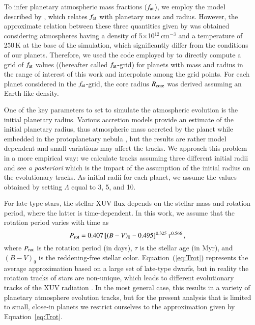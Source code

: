 \documentclass{aa}
\begin{document}
{To infer planetary atmospheric mass fractions ($f_{\rm at}$), we
employ the model described by \citet{johnstone2015}, which relates
$f_{\rm at}$ with planetary mass and radius. However, the
approximate relation between these three quantities given by
\citet{johnstone2015} was obtained considering atmospheres having
a density of 5$\times$10$^{12}$\,cm$^{-3}$ and a temperature of
250\,K at the base of the simulation, which significantly differ
from the conditions of our planets. Therefore, we used the code
employed by \citet{johnstone2015} to directly compute a grid of
$f_{\rm at}$ values ((hereafter called $f_{\rm at}$-grid) for
planets with mass and radius in the range of interest of this work
and interpolate among the grid points. For each planet considered
in the $f_{\rm at}$-grid, the core radius $R_{\rm core}$ was
derived assuming an Earth-like density.}

{One of the key parameters to set to simulate the atmospheric
evolution is the initial planetary radius. Various accretion
models provide an estimate of the initial planetary radius, thus
atmospheric mass accreted by the planet while embedded in the
protoplanetary nebula \citep[e.g.,][]{stokl2016}, but the results
are rather model dependent and small variations may affect the
tracks. We approach this problem in a more empirical way: we
calculate tracks assuming three different initial radii and see
{\it a posteriori} which is the impact of the assumption of the
initial radius on the evolutionary tracks. As initial radii for
each planet, we assume the values obtained by setting $\Lambda$
equal to 3, 5, and 10.}

{For late-type stars, the stellar XUV flux depends on the stellar
mass and rotation period, where the latter is time-dependent. In
this work, we assume that the rotation period varies with time as
\citep{mamajek2008}}
\begin{equation}
\label{eq:Trot}
P_{\rm rot}=0.407\,[(B-V)_0-0.495]^{0.325}\,\tau^{0.566}\,,
\end{equation}
where $P_{\rm rot}$ is the rotation period (in days), $\tau$ is
the stellar age (in Myr), and $(B-V)_0$ is the reddening-free
stellar color. {Equation~(\ref{eq:Trot}) represents the average
approximation based on a large set of late-type dwarfs, but in
reality the rotation tracks of stars are non-unique, which leads
to different evolutionary tracks of the XUV radiation
\citep{johnstone2015rot,tu2015}. In the most general case, this
results in a variety of planetary atmosphere evolution tracks, but
for the present analysis that is limited to small, close-in
planets we restrict ourselves to the approximation given by
Equation~\ref{eq:Trot}.}
\end{document}
